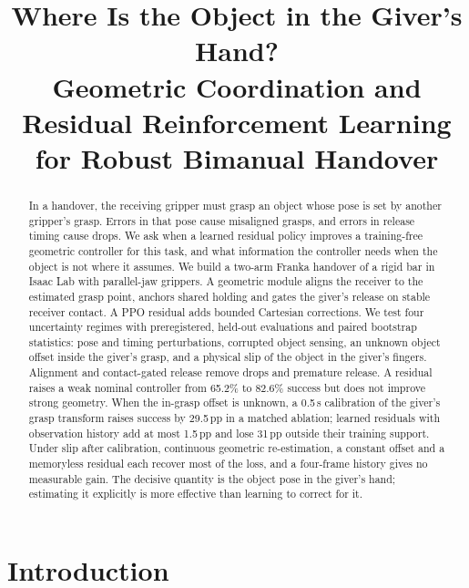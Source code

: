 \documentclass[conference,letterpaper]{IEEEtran}
\newcommand{\pp}{\,pp}
\begin{document}
\title{Where Is the Object in the Giver's Hand?\\ Geometric Coordination and Residual Reinforcement Learning for Robust Bimanual Handover}

\author{
}

\maketitle

\begin{abstract}
In a handover, the receiving gripper must grasp an object whose pose is set by another gripper's grasp. Errors
in that pose cause misaligned grasps, and errors in release timing cause drops. We ask when a learned residual
policy improves a training-free geometric controller for this task, and what information the controller needs
when the object is not where it assumes. We build a two-arm Franka handover of a rigid bar in Isaac Lab with
parallel-jaw grippers. A geometric module aligns the receiver to the estimated grasp point, anchors shared holding
and gates the giver's release on stable receiver contact. A PPO residual adds bounded Cartesian corrections. We test
four uncertainty regimes with preregistered, held-out evaluations and paired bootstrap statistics: pose and timing
perturbations, corrupted object sensing, an unknown object offset inside the giver's grasp, and a physical slip of
the object in the giver's fingers. Alignment and contact-gated release remove drops and premature release. A
residual raises a weak nominal controller from 65.2\% to 82.6\% success but does not improve strong geometry. When
the in-grasp offset is unknown, a 0.5\,s calibration of the giver's grasp transform raises success by
29.5\pp{} in a matched ablation; learned residuals with observation history add at most 1.5\pp{} and lose 31\pp{}
outside their training support. Under slip after calibration, continuous geometric re-estimation, a constant offset
and a memoryless residual each recover most of the loss, and a four-frame history gives no measurable gain. The
decisive quantity is the object pose in the giver's hand; estimating it explicitly is more effective than learning to
correct for it.
\end{abstract}



\section{Introduction}
\end{document}
